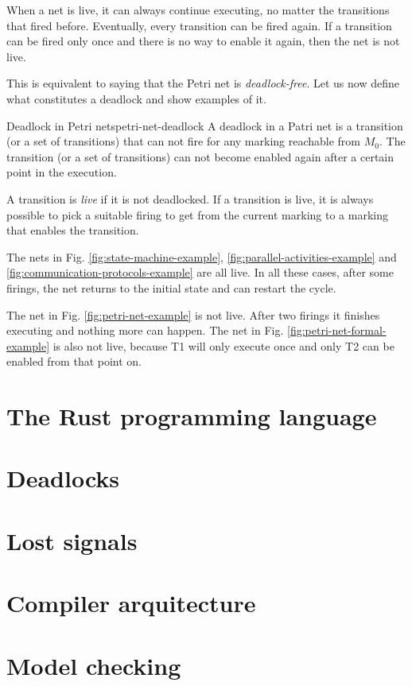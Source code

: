 When a net is live, it can always continue executing,
no matter the transitions that fired before.
Eventually, every transition can be fired again.
If a transition can be fired only once and there is no way to enable it again,
then the net is not live.

This is equivalent to saying that the Petri net is \textit{deadlock-free}.
Let us now define what constitutes a deadlock and show examples of it.

\begin{definition}{Deadlock in Petri nets}{petri-net-deadlock}
    A deadlock in a Patri net is a transition (or a set of transitions) that can not fire
    for any marking reachable from $M_0$.
    The transition (or a set of transitions) can not become enabled again
    after a certain point in the execution.
\end{definition}

A transition is \emph{live} if it is not deadlocked.
If a transition is live, it is always possible to pick a suitable firing
to get from the current marking to a marking that enables the transition.

The nets in Fig. \ref{fig:state-machine-example}, \ref{fig:parallel-activities-example}
and \ref{fig:communication-protocols-example} are all live.
In all these cases, after some firings,
the net returns to the initial state and can restart the cycle.

The net in Fig. \ref{fig:petri-net-example} is not live.
After two firings it finishes executing and nothing more can happen.
The net in Fig. \ref{fig:petri-net-formal-example} is also not live, because
T1 will only execute once and only T2 can be enabled from that point on.

\section{The Rust programming language}

\section{Deadlocks}

\section{Lost signals}

\section{Compiler arquitecture}

\section{Model checking}

\bigskip